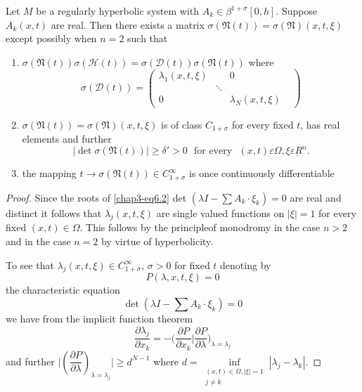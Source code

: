 \setcounter{proposition}{0}
\begin{proposition}[Petrowsky]\label{chap3-sec6-prop1} %
Let $M$ be a regularly hyperbolic system with $A_k
\in \beta^{1+\sigma}[0, h]$. Suppose $A_k(x, t)$ are real. Then there
exists a matrix $\sigma(\mathfrak{N}(t)) =
\sigma(\mathfrak{N})(x, t, \xi)$ except possibly when $n
= 2$ such that 
\begin{enumerate}[\rm(i)]
\item $\sigma(\mathfrak{N}(t))\sigma(\mathscr{H}(t)) =
  \sigma(\mathscr{D}(t)) \sigma(\mathfrak{N}(t))$ where 
$$
\sigma (\mathscr{D}(t)) = 
\begin{pmatrix}
\lambda_1(x,t, \xi) & & 0 \\
 & \ddots & &\\
0  & & \lambda_N(x, t,\xi)
\end{pmatrix}
$$

\item $\sigma(\mathfrak{N}(t)) = \sigma (\mathfrak{N})(x, t, \xi )$ is
  of class $C_{1 + \sigma}$ for every fixed $t$, has real elements
  and further 
\begin{equation*}
 | \det \sigma (\mathfrak{N}(t))| \geq \delta' > 0 \text{~ for every~ }
 (x, t) \varepsilon \Omega , \xi \varepsilon
 \underbar{R}^n.\tag{6.4}\label{chap3-eq6.4}  
\end{equation*}

\item the mapping $t \to \sigma (\mathfrak{N}(t)) \in
  C_{1+\sigma}^{\infty}$ is once continuously differentiable 
\end{enumerate}
\end{proposition}

\begin{proof}%
Since the roots of \eqref{chap3-eq6.2} det $(\lambda I-\sum A_k \cdot
\xi_k) = 0$ are 
real and distinct it follows that $\lambda_j(x, t, \xi)$ are single
valued functions on $|\xi| = 1$ for every fixed $(x, t)\in
\Omega$. This follows by the principle\pageoriginale of monodromy in
the case $n > 2$ and in the case $n=2$ by virtue of hyperbolicity.  

To see that $\lambda_j(x, t, \xi ) \in C^{\infty}_{1+\sigma}$,
$\sigma > 0$ for fixed $t$ denoting by $$
P (\lambda, x, t, \xi) = 0
$$ 
the characteristic equation 
$$
\det \left(\lambda I-\sum A_k \cdot \xi_k\right) = 0 
$$
we have from the implicit function theorem
$$
\frac{\partial \lambda_j}{\partial x_k} = - \bigg(\frac{\partial P}{\partial
  x_k} \bigg| \frac{\partial P}{\partial \lambda}\bigg)_{\lambda =
  \lambda_j} 
$$
and further $\big|\left(\dfrac{\partial P}{\partial
  \lambda}\right)_{{\lambda} = {\lambda_j}} \big| \geq d^{N-1}$ where
$d=\inf\limits_{\substack{(x, t) 
  \in \Omega, |\xi|=1\\ j\neq k}} |\lambda_j - \lambda_k|$. 
\end{proof}


